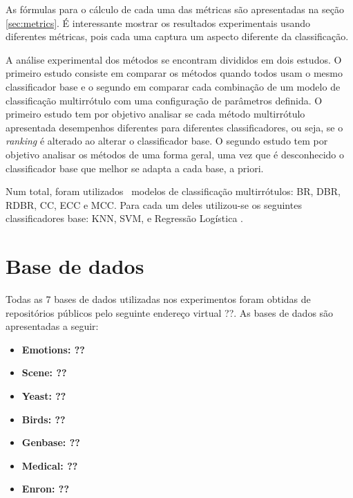 As fórmulas para o cálculo de cada uma das métricas são apresentadas na seção \ref{sec:metrics}.
É interessante mostrar os resultados experimentais usando diferentes métricas, pois cada uma captura
um aspecto diferente da classificação. 

A análise experimental dos métodos se encontram divididos em dois estudos. O primeiro estudo consiste em
comparar os métodos quando todos usam o mesmo classificador base e o segundo em comparar cada combinação de um
modelo de classificação multirrótulo com uma configuração de parâmetros definida. 
O primeiro estudo tem por objetivo analisar se cada método multirrótulo apresentada desempenhos diferentes para
diferentes classificadores, ou seja, se o \textit{ranking} é alterado ao alterar o classificador base.
O segundo estudo tem por objetivo analisar os métodos de uma forma geral, uma vez que é desconhecido
o classificador base que melhor se adapta a cada base, a priori.

Num total, foram utilizados \Nml~modelos de classificação multirrótulos: BR, DBR, RDBR, CC, ECC e MCC.
Para cada um deles utilizou-se os seguintes classificadores base: KNN, SVM, \jqo e Regressão Logística \cite{classificadoresbases}. 


\section{Base de dados}
\label{sec:datas}
Todas as 7 bases de dados utilizadas nos experimentos foram obtidas de repositórios públicos pelo seguinte endereço virtual ??.
As bases de dados são apresentadas a seguir:

\begin{itemize}
\item \bf{Emotions}: ??
\item \bf{Scene}: ??
\item \bf{Yeast}: ??
\item \bf{Birds}: ??
\item \bf{Genbase}: ??
\item \bf{Medical}: ??
\item \bf{Enron}: ??	

\end{itemize}

